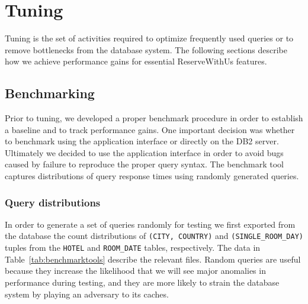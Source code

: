 \documentclass[letterpaper]{article}%
\begin{document}
\section{Tuning}

Tuning is the set of activities required to optimize frequently used queries or
to remove bottlenecks from the database system. The following sections describe
how we achieve performance gains for essential ReserveWithUs features.

\subsection{Benchmarking}

Prior to tuning, we developed a proper benchmark procedure in order to
establish a baseline and to track performance gains. One important decision was
whether to benchmark using the application interface or directly on the DB2
server. Ultimately we decided to use the application interface in order to
avoid bugs caused by failure to reproduce the proper query syntax. The
benchmark tool captures distributions of query response times using randomly
generated queries.

\subsubsection{Query distributions}

In order to generate a set of queries randomly for testing we first exported
from the database the count distributions of \texttt{(CITY, COUNTRY)} and
\texttt{(SINGLE\_ROOM\_DAY)} tuples from the \texttt{HOTEL} and
\texttt{ROOM\_DATE} tables, respectively. The data in
Table~\ref{tab:benchmarktools} describe the relevant files. Random queries are
useful because they increase the likelihood that we will see major anomalies in
performance during testing, and they are more likely to strain the database
system by playing an adversary to its caches.
\end{document}
